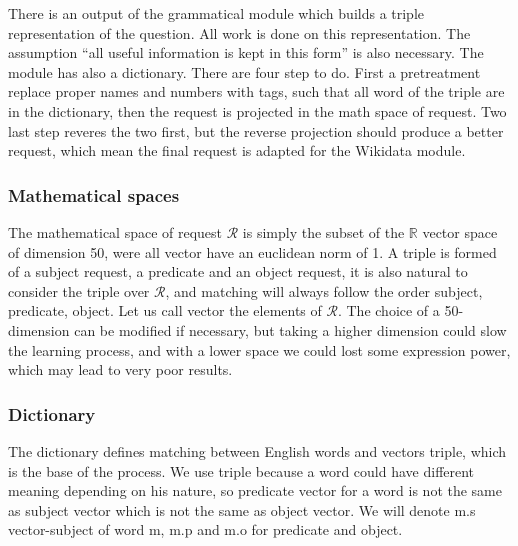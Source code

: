 There is an output of the grammatical module which builds a triple representation of the question. All work is done on this representation. The assumption ``all useful information is kept in this form''  is also necessary. The module has also a dictionary. There are four step to do. First a pretreatment replace proper names and numbers with tags, such that all word of the triple are in the dictionary, then the request is projected in the math space of request. Two last step reveres the two first, but the reverse projection should produce a better request, which mean the final request is adapted for the Wikidata module.

\subsubsection{Mathematical spaces}

The mathematical space of request $\mathcal{R}$ is simply the subset of the $\mathbb{R}$ vector space of dimension 50, were all vector have an euclidean norm of 1.
A triple is formed of a subject request, a predicate and an object request, it is also natural to consider the triple over $\mathcal{R}$, and matching will always follow the order subject, predicate, object.
Let us call vector the elements of $\mathcal{R}$.
The choice of a 50-dimension can be modified if necessary, but taking a higher dimension could slow the learning process, and with a lower space we could lost some expression power, which may lead to very poor results.



\subsubsection{Dictionary}

The dictionary defines matching between English words and vectors triple, which is the base of the process. We use triple because a word could have different meaning depending on his nature, so predicate vector for a word is not the same as subject vector which is not the same as object vector. We will denote m.s vector-subject of word m, m.p and m.o for predicate and object.


